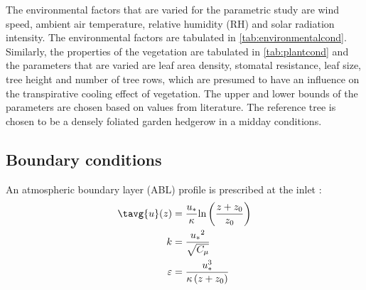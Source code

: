 The environmental factors that are varied for the parametric study are wind speed, ambient air temperature, relative humidity (RH) and solar radiation intensity. The environmental factors are tabulated in \cref{tab:environmentalcond}.  Similarly, the properties of the vegetation are tabulated in \cref{tab:plantcond} and the parameters that are varied are leaf area density, stomatal resistance, leaf size, tree height and number of tree rows, which are presumed to have an influence on the transpirative cooling effect of vegetation. The upper and lower bounds of the parameters are chosen based on values from literature. The reference tree is chosen to be a densely foliated garden hedgerow in a midday conditions. 





\subsection{Boundary conditions}

An atmospheric boundary layer (ABL) profile is prescribed at the inlet \citep{Richards1993}:
\begin{align}
\tavg{u}(z) &= \frac{{{u_*}}}{\kappa }{\text{ln}}\left( {\frac{{z + {z_0}}}{{{z_0}}}} \right) \\
k &= \frac{{{u_*}^2}}{{\sqrt {{C_\mu }} }} \\
\varepsilon  &= \frac{{u_*^3}}{{\kappa \left( {z + {z_0}} \right)}}
\end{align}

